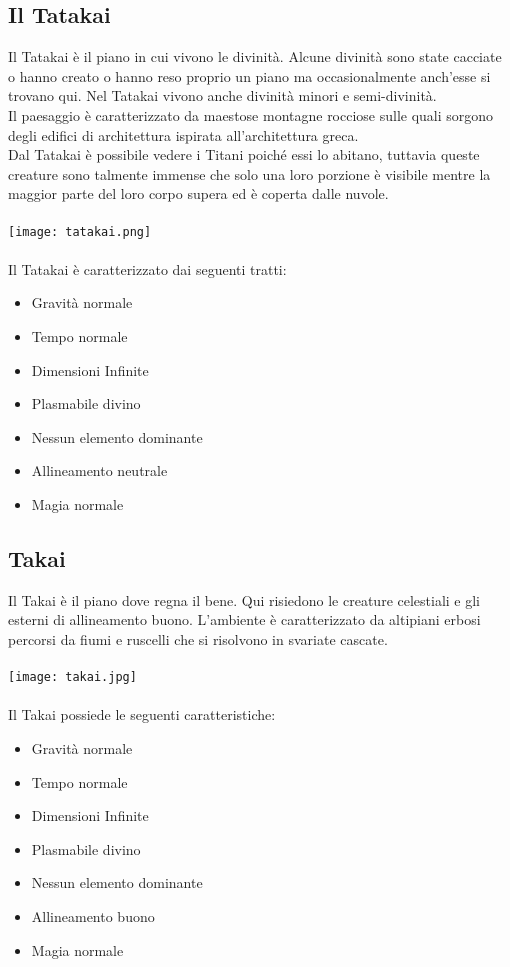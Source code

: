 \documentclass[a4paper]{report}
\begin{document}
\begin{multicols}{2}
\subsection*{Il Tatakai}
Il Tatakai è il piano in cui vivono le divinità. Alcune divinità sono state cacciate o hanno creato o hanno reso proprio un piano ma occasionalmente anch'esse si trovano qui. Nel Tatakai vivono anche divinità minori e semi-divinità.\\
Il paesaggio è caratterizzato da maestose montagne rocciose sulle quali sorgono degli edifici di architettura ispirata all'architettura greca.\\
Dal Tatakai è possibile vedere i Titani poiché essi lo abitano, tuttavia queste creature sono talmente immense che solo una loro porzione è visibile mentre la maggior parte del loro corpo supera ed è coperta dalle nuvole.\\
\\
\texttt{[image: tatakai.png]}\\
\\
Il Tatakai è caratterizzato dai seguenti tratti:
\begin{itemize}
	\item Gravità normale
	\item Tempo normale
	\item Dimensioni Infinite
	\item Plasmabile divino
	\item Nessun elemento dominante
	\item Allineamento neutrale
	\item Magia normale
\end{itemize}

\subsection*{Takai}
Il Takai è il piano dove regna il bene. Qui risiedono le creature celestiali e gli esterni di allineamento buono. L'ambiente è caratterizzato da altipiani erbosi percorsi da fiumi e ruscelli che si risolvono in svariate cascate.\\
\\
\texttt{[image: takai.jpg]}\\
\\
Il Takai possiede le seguenti caratteristiche:
\begin{itemize}
	\item Gravità normale
	\item Tempo normale
	\item Dimensioni Infinite
	\item Plasmabile divino
	\item Nessun elemento dominante
	\item Allineamento buono
	\item Magia normale
\end{itemize}


\end{multicols}
\end{document}
